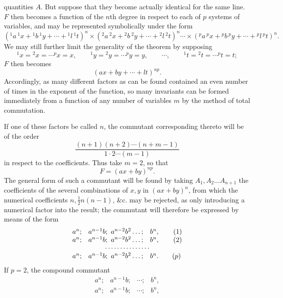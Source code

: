 \documentclass[11pt]{article}
\newcommand{\sourcepage}[1]{\marginpar{\scriptsize p.~#1}}
\begin{document}
\sourcepage{314}
quantities $A$. But suppose that they become actually identical for the same line. $F$ then becomes a function of the $n$th degree in respect to each of $p$ systems of variables, and may be represented symbolically under the form
\[
({}^{1}a\,{}^{1}x+{}^{1}b\,{}^{1}y+\cdots+{}^{1}l\,{}^{1}t)^n
\times({}^{2}a\,{}^{2}x+{}^{2}b\,{}^{2}y+\cdots+{}^{2}l\,{}^{2}t)^n
\cdots\times({}^{p}a\,{}^{p}x+{}^{p}b\,{}^{p}y+\cdots+{}^{p}l\,{}^{p}t)^n.
\]
We may still further limit the generality of the theorem by supposing
\[
{}^{1}x={}^{2}x=\cdots{}^{p}x=x,\qquad
{}^{1}y={}^{2}y=\cdots{}^{p}y=y,\qquad
\cdots,\qquad
{}^{1}t={}^{2}t=\cdots{}^{p}t=t;
\]
$F$ then becomes
\[
(ax+by+\cdots+lt)^{np}.
\]
Accordingly, as many different factors as can be found contained an even number of times in the exponent of the function, so many invariants can be formed immediately from a function of any number of variables $m$ by the method of total commutation.

If one of these factors be called $n$, the commutant corresponding thereto will be of the order
\[
\frac{(n+1)(n+2)\cdots(n+m-1)}{1\cdot2\cdots(m-1)}
\]
in respect to the coefficients. Thus take $m=2$, so that
\[
F=(ax+by)^{np}.
\]
The general form of such a commutant will be found by taking $A_1,A_2\ldots A_{n+1}$ the coefficients of the several combinations of $x,y$ in $(ax+by)^n$, from which the numerical coefficients $n,\frac12n(n-1)$, \&c. may be rejected, as only introducing a numerical factor into the result; the commutant will therefore be expressed by means of the form
\[
\begin{array}{rcl}
a^n;&a^{n-1}b;\ a^{n-2}b^2\ldots;&b^n,\qquad (1)\\
a^n;&a^{n-1}b;\ a^{n-2}b^2\ldots;&b^n,\qquad (2)\\
\multicolumn{3}{c}{\cdots\cdots\cdots\cdots\cdots}\\
a^n;&a^{n-1}b;\ a^{n-2}b^2\ldots;&b^n.\qquad (p)
\end{array}
\]
If $p=2$, the compound commutant
\[
\begin{array}{cccc}
a^n;&a^{n-1}b;&\cdots;&b^n,\\
a^n;&a^{n-1}b;&\cdots;&b^n,
\end{array}
\]
\end{document}
